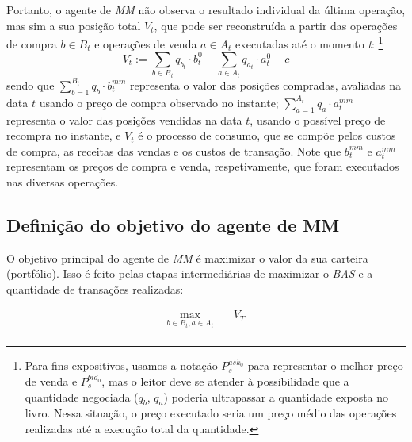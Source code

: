 Portanto, o agente de \textit{MM} não observa o resultado individual da última operação, mas sim a sua posição total $V_{t}$, que pode ser reconstruída a partir das operações de compra $b\in B_t$ e operações de venda $a\in A_t$ executadas até o momento \textit{t}: \footnote{Para fins expositivos, usamos a notação $P_s^{ask_0}$ para representar o melhor preço de venda e $P_s^{bid_0}$, mas o leitor deve se atender à possibilidade que a quantidade negociada ($q_b$, $q_a$) poderia ultrapassar a quantidade exposta no livro. Nessa situação, o preço executado seria um preço médio das operações realizadas até a execução total da quantidade. }
\begin{equation}
    V_{t} := \sum_{b \in B_t} q_{b_{t}} \cdot b_{t}^{0} - \sum_{a \in A_t} q_{a_{t}} \cdot a_t^{0} - c
\end{equation}
sendo que $\sum_{b=1}^{B_t} q_b \cdot b_{t}^{mm} $ representa o valor das posições compradas, avaliadas na data $t$  usando o preço de compra observado no instante; $\sum_{a=1}^{A_t} q_a \cdot a_{t}^{mm}$ representa o valor das posições vendidas na data $t$, usando o possível preço de recompra no instante, e $V_t$ é o processo de consumo, que se compõe pelos custos de compra, as receitas das vendas e os custos de transação. Note que $b_{t}^{mm}$ e $a_{t}^{mm}$ representam os preços de compra e venda, respetivamente, que foram executados nas diversas operações. 

\subsection{Definição do objetivo do agente de MM}
O objetivo principal do agente de \textit{MM} é maximizar o valor da sua carteira (portfólio). Isso é feito pelas etapas intermediárias de maximizar o \textit{BAS} e a quantidade de transações realizadas:

\begin{equation}
\begin{aligned}
\max_{b \in B_{t}, a \in A_{t}} \quad & V_T \label{eq:target_fct}\\
\end{aligned}
\end{equation}

